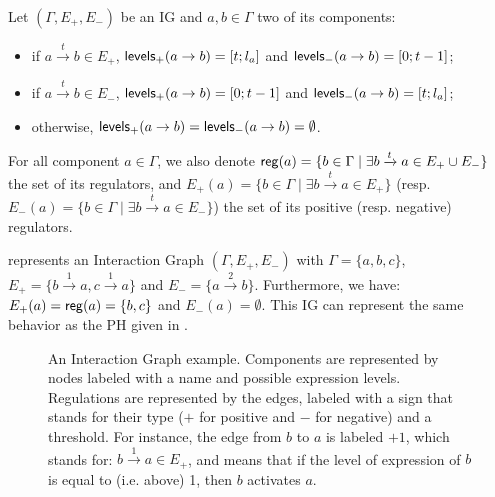 \begin{definition}\label{def:levels}
Let $(\Gamma,E_+,E_-)$ be an IG and $a, b \in \Gamma$ two of its components:
\begin{itemize}
  \item if $a \xrightarrow{t} b \in E_+$, $\mathsf{levels}_+(a\rightarrow b) = [t; l_a]$ and
    $\mathsf{levels}_-(a\rightarrow b) = [0; t-1]$;
  \item if $a \xrightarrow{t} b \in E_-$, $\mathsf{levels}_+(a\rightarrow b) = [0; t-1]$ and
    $\mathsf{levels}_-(a\rightarrow b) = [t; l_a]$;
  \item otherwise, $\mathsf{levels}_+(a\rightarrow b) = \mathsf{levels}_-(a\rightarrow b) = \emptyset$.
\end{itemize}
\end{definition}

For all component $a \in \Gamma$, we also denote $\mathsf{reg}({a}) = \{b \in \Gamma \mid \exists b \xrightarrow{t} a \in E_+ \cup E_-\}$ the set of its regulators,
and $E_+(a) = \{b \in \Gamma \mid \exists b \xrightarrow{t} a \in E_+\}$ (resp. $E_-(a) = \{b \in \Gamma \mid \exists b \xrightarrow{t} a \in E_-\}$) the set of its positive (resp. negative) regulators.

\begin{example*}
 represents an Interaction Graph $(\Gamma,E_+,E_-)$ with
$\Gamma = \{a, b, c\}$,
$E_+ = \{b \xrightarrow{1} a, c \xrightarrow{1} a\}$ and
$E_- = \{a \xrightarrow{2} b\}$.
Furthermore, we have: $E_+(a) = \mathsf{reg}({a}) = \{b, c\}$ and $E_-(a) = \emptyset$.
This IG can represent the same behavior as the PH given in .

\begin{figure}[t]
\centering
{}
\caption{\label{fig:runningBRN-ig}
An Interaction Graph example.
Components are represented by nodes labeled with a name and possible expression levels.
Regulations are represented by the edges, labeled with a sign that stands for their type ($+$ for positive and $-$ for negative) and a threshold.
For instance, the edge from $b$ to $a$ is labeled $+1$, which stands for: $b \xrightarrow{1} a \in E_+$,
and means that if the level of expression of $b$ is equal to (i.e. above) 1, then $b$ activates $a$.
}
\end{figure}
\end{example*}


